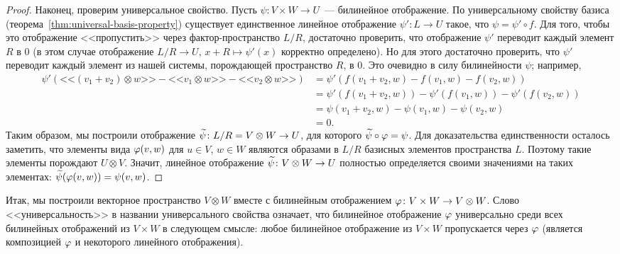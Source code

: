 \begin{proof}
Наконец, проверим универсальное свойство.
Пусть $\psi\colon V\times W\to U$~--- билинейное отображение.
По универсальному свойству базиса
(теорема~\ref{thm:universal-basis-property}) существует единственное
линейное отображение $\psi'\colon L\to U$ такое, что $\psi=\psi'\circ
f$. Для того, чтобы это отображение <<пропустить>> через
фактор-пространство
$L/R$, достаточно проверить, что отображение $\psi'$ переводит каждый
элемент $R$ в $0$ (в этом случае отображение $L/R\to U$,
$x+R\mapsto \psi'(x)$ корректно определено).
Но для этого достаточно проверить, что $\psi'$ переводит каждый
элемент из нашей системы, порождающей пространство $R$, в $0$.
Это очевидно в силу билинейности $\psi$; например,
\begin{align*}
\psi'(\mbox{<<}(v_1+v_2)\otimes w\mbox{>>} -
\mbox{<<}v_1\otimes w\mbox{>>} -
\mbox{<<}v_2\otimes w\mbox{>>})
&= \psi'(f(v_1+v_2,w)-f(v_1,w)-f(v_2,w)) \\
&= \psi'(f(v_1+v_2,w))-\psi'(f(v_1,w))-\psi'(f(v_2,w))\\
&= \psi(v_1+v_2,w) - \psi(v_1,w) - \psi(v_2,w)\\
&= 0.
\end{align*}
Таким образом, мы построили отображение
$\widetilde\psi\colon L/R = V\otimes W\to U$, для которого $\widetilde\psi\circ\varphi
= \psi$. Для доказательства единственности осталось заметить, что
элементы вида $\varphi(v,w)$ для $u\in V$, $w\in W$ являются образами в
$L/R$ базисных элементов пространства $L$. Поэтому такие элементы
порождают $U\otimes V$. Значит, линейное отображение $\widetilde\psi\colon
V\otimes W\to U$ полностью определяется своими значениями на таких
элементах: $\widetilde\psi(\varphi(v,w)) = \psi(v,w)$.
\end{proof}

Итак, мы построили векторное пространство $V\otimes W$ вместе с
билинейным отображением $\varphi\colon V\times W\to V\otimes W$. Слово
<<универсальность>> в названии универсального свойства означает, что
билинейное отображение $\varphi$ универсально среди всех билинейных
отображений из $V\times W$ в следующем смысле: любое билинейное
отображение из $V\times W$ пропускается через $\varphi$ (является
композицией $\varphi$ и некоторого линейного отображения).

